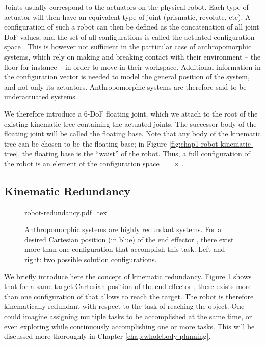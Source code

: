 Joints usually correspond to the actuators on the physical robot. Each
type of actuator will then have an equivalent type of joint
(prismatic, revolute, etc). A configuration \config{} of such a robot
can then be defined as the concatenation of all joint DoF values, and
the set of all configurations is called the actuated configuration
space {\actcspace}. This is however not sufficient in the particular
case of anthropomorphic systems, which rely on making and breaking
contact with their environment -- the floor for instance -- in order
to move in their workspace. Additional information in the
configuration vector is needed to model the general position of the
system, and not only its actuators. Anthropomorphic systems are
therefore said to be underactuated systems.

We therefore introduce a 6-DoF floating joint, which we attach to the
root of the existing kinematic tree containing the actuated
joints. The successor body of the floating joint will be called the
floating base. Note that any body of the kinematic tree can be chosen
to be the floating base; in Figure
\ref{fig:chap1-robot-kinematic-tree}, the floating base is the
``waist'' of the robot. Thus, a full configuration \config{} of the
robot {\robot} is an element of the configuration space {\cspace} $=$
{\segroup} $\times$ {\actcspace}.
 
\subsection{Kinematic Redundancy}
\label{subsec:chap1-kinematic-redundancy}

\begin{figure}
  \centering
      {\def\svgwidth{0.8\linewidth}
        
                   {robot-redundancy.pdf_tex}}
      \caption{Anthropomorphic systems are highly redundant
        systems. For a desired Cartesian position (in blue) of the end
        effector , there exist more than one configuration
        \config{} that accomplish this task. Left and right: two
        possible solution configurations.}
      \label{fig:chap1-robot-redundancy}
\end{figure}

We briefly introduce here the concept of kinematic redundancy. Figure
\ref{fig:chap1-robot-redundancy} shows that for a same target
Cartesian position of the end effector , there exists more
than one configuration of {\robot} that allows  to
reach the target. The robot {\robot} is therefore
kinematically redundant with respect to the task of reaching the
object. One could imagine assigning multiple tasks to be accomplished
at the same time, or even exploring {\cspace} while continuously
accomplishing one or more tasks. This will be discussed more
thoroughly in Chapter \ref{chap:wholebody-planning}.

